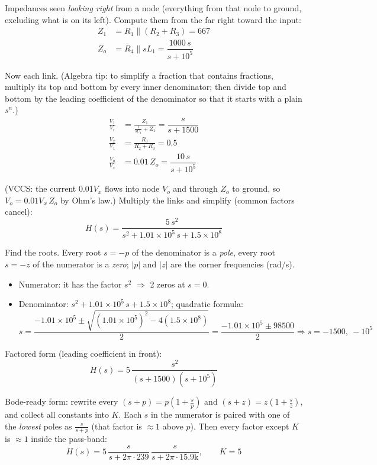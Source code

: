 \documentclass[11pt]{article}
\newcommand{\solstep}[2]{\par\medskip{\color{stepc}\textbf{Step #1 --- #2}}\par\nopagebreak}
\begin{document}
Impedances seen \emph{looking right} from a node (everything from that node to ground, excluding what is on its left). Compute them from the far right toward the input:
\begin{align*}
Z_{1} &= R_{1} \parallel \left(R_{2} + R_{3}\right) = 667 \\
Z_{o} &= R_{4} \parallel sL_{1} = \dfrac{1000\,s}{s + 10^{5}}
\end{align*}

Now each link. {\small (Algebra tip: to simplify a fraction that contains fractions, multiply its top and bottom by every inner denominator; then divide top and bottom by the leading coefficient of the denominator so that it starts with a plain $s^n$.)}
\begin{align*}
\frac{V_{1}}{V_{i}} &= \frac{Z_{1}}{\frac{1}{sC_{1}} + Z_{1}} = \dfrac{s}{s + 1500} \\
\frac{V_{x}}{V_{1}} &= \frac{R_{3}}{R_{2} + R_{3}} = 0.5 \\
\frac{V_{o}}{V_{x}} &= 0.01\,Z_{o} = \dfrac{10\,s}{s + 10^{5}}
\end{align*}

(VCCS: the current $0.01V_{x}$ flows into node $V_{o}$ and through $Z_{o}$ to ground, so $V_{o} = 0.01V_{x}\,Z_{o}$ by Ohm's law.)
Multiply the links and simplify (common factors cancel):\[
H(s) = \dfrac{5\,s^{2}}{s^{2} + 1.01\times 10^{5}\,s + 1.5\times 10^{8}}
\]

\solstep{5}{Standard (Bode-ready) form}Find the roots. Every root $s=-p$ of the denominator is a \emph{pole}, every root $s=-z$ of the numerator is a \emph{zero}; $|p|$ and $|z|$ are the corner frequencies (rad/s).
\begin{itemize}[leftmargin=*,itemsep=2pt]
\item Numerator: it has the factor $s^2$ $\Rightarrow$ 2 zeros at $s=0$.
\item Denominator: $s^{2} + 1.01\times 10^{5}\,s + 1.5\times 10^{8}$; quadratic formula:\[
s = \frac{-1.01\times 10^{5} \pm \sqrt{(1.01\times 10^{5})^2 - 4(1.5\times 10^{8})}}{2} = \frac{-1.01\times 10^{5} \pm 98500}{2} \Rightarrow s = -1500,\ -10^{5}
\]

\end{itemize}

Factored form (leading coefficient in front):
\[
H(s) = 5\,\dfrac{s^{2}}{(s+1500)(s+10^{5})}
\]

Bode-ready form: rewrite every $(s+p) = p\left(1+\frac{s}{p}\right)$ and $(s+z) = z\left(1+\frac{s}{z}\right)$, and collect all constants into $K$. Each $s$ in the numerator is paired with one of the \emph{lowest} poles as $\frac{s}{s+p}$ (that factor is $\approx 1$ above $p$). Then every factor except $K$ is $\approx 1$ inside the pass-band:
\[
H(s) = 5\,\dfrac{s}{s+2\pi\cdot 239}\,\dfrac{s}{s+2\pi\cdot 15.9\mathrm{k}},\qquad K = 5
\]
\end{document}
